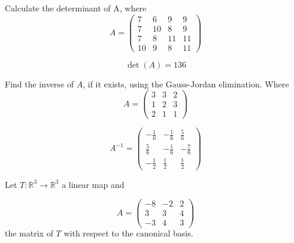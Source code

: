 \begin{questions}

\question Calculate the determinant of A, where
$$
A=\left(\begin{array}{rrrr}
7 & 6 & 9 & 9 \\
7 & 10 & 8 & 9 \\
7 & 8 & 11 & 11 \\
10 & 9 & 8 & 11
\end{array}\right)
$$

\begin{solution}
$$\det(A)=136$$
\end{solution}

\question Find the inverse of $A$, if it exists, using the Gauss-Jordan elimination. Where
$$
A=\left(\begin{array}{rrr}
3 & 3 & 2 \\
1 & 2 & 3 \\
2 & 1 & 1
\end{array}\right)
$$

\begin{solution}
$$A^{-1}=\left(\begin{array}{rrr}
-\frac{1}{6} & -\frac{1}{6} & \frac{5}{6} \\
\frac{5}{6} & -\frac{1}{6} & -\frac{7}{6} \\
-\frac{1}{2} & \frac{1}{2} & \frac{1}{2}
\end{array}\right)$$
\end{solution}

\question Let $T:\mathbb{R}^3\rightarrow\mathbb{R}^3$  a linear map and
 
$$
A=\left(\begin{array}{rrr}
-8 & -2 & 2 \\
3 & 3 & 4 \\
-3 & 4 & 3
\end{array}\right)
$$
the matrix of $T$ with respect to the canonical basis.
\end{questions}
